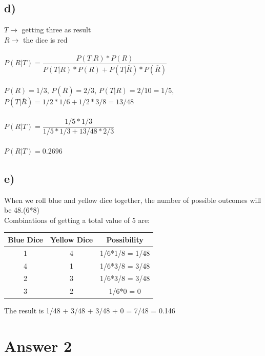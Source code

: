\documentclass[12pt]{article}
\begin{document}
\subsection*{d)} 
$T \rightarrow$ getting three as result\\
$R \rightarrow$ the dice is red\\
\\
$P(R|T) = \dfrac{P(T|R)*P(R)}{P(T|R)*P(R) + P(T|\overline R)*P(\overline R)}$\\
\\
$P(R) = 1/3$, $P(\overline R) = 2/3$, $P(T|R) = 2/10 = 1/5$, $P(T|\overline R) = 1/2*1/6+1/2*3/8 = 13/48$\\
\\
$P(R|T) = \dfrac{1/5*1/3}{1/5*1/3 + 13/48*2/3}$\\
\\
$P(R|T) = 0.2696$\\


\subsection*{e)} 
When we roll blue and yellow dice together, the number of possible outcomes will be 48.(6*8)\\
Combinations of getting a total value of 5 are:\\

\begin{table}[H]
        \centering
        \begin{tabular}{|c|c|c|}
		\hline
		Blue Dice & Yellow Dice & Possibility\\
		\hline
		1 & 4 & 1/6*1/8 = 1/48\\
		4 & 1 & 1/6*3/8 = 3/48\\
		2 & 3 & 1/6*3/8 = 3/48\\
		3 & 2 & 1/6*0 = 0\\
		\hline
               
        \end{tabular}
        

    \end{table}{}

The result is 1/48 + 3/48 + 3/48 + 0 = 7/48 = 0.146\\

\section*{Answer 2}
\end{document}
